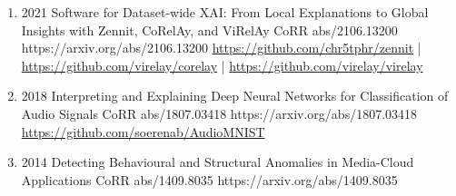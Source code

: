 {\begin{enumerate}
        \item {}
                            {2021}
                            {Software for Dataset-wide XAI: From Local Explanations to Global Insights with Zennit, CoRelAy, and ViRelAy}
                            {CoRR abs/2106.13200}
                            {https://arxiv.org/abs/2106.13200}
                            {   \href{https://github.com/chr5tphr/zennit}{https://github.com/chr5tphr/zennit} | \\
                                \href{https://github.com/virelay/corelay}{https://github.com/virelay/corelay} |
                                \href{https://github.com/virelay/virelay}{https://github.com/virelay/virelay}
                            }

        \item {}
                            {2018}
                            {Interpreting and Explaining Deep Neural Networks for Classification of Audio Signals}
                            {CoRR abs/1807.03418}
                            {https://arxiv.org/abs/1807.03418}
                            {\href{https://github.com/soerenab/AudioMNIST}{https://github.com/soerenab/AudioMNIST}}

        \item {}
                            {2014}
                            {Detecting Behavioural and Structural Anomalies in Media-Cloud Applications}
                            {CoRR abs/1409.8035}
                            {https://arxiv.org/abs/1409.8035}

    \end{enumerate}

}